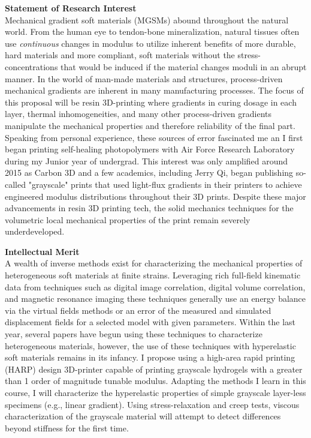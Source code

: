 \textbf{Statement of Research Interest} \\
Mechanical gradient soft materials (MGSMs) abound throughout the natural world. From the human eye to tendon-bone mineralization, natural tissues often use \textit{continuous} changes in modulus to utilize inherent benefits of more durable, hard materials and more compliant, soft materials without the stress-concentrations that would be induced if the material changes moduli in an abrupt manner. In the world of man-made materials and structures, process-driven mechanical gradients are inherent in many manufacturing processes. The focus of this proposal will be resin 3D-printing where gradients in curing dosage in each layer, thermal inhomogeneities, and many other process-driven gradients manipulate the mechanical properties and therefore reliability of the final part. Speaking from personal experience, these sources of error fascinated me an I first began printing self-healing photopolymers with Air Force Research Laboratory during my Junior year of undergrad. This interest was only amplified around 2015 as Carbon 3D and a few academics, including Jerry Qi, began publishing so-called "grayscale" prints that used light-flux gradients in their printers to achieve engineered modulus distributions throughout their 3D prints. Despite these major advancements in resin 3D printing tech, the solid mechanics techniques for  the volumetric local mechanical properties of the print remain severely underdeveloped.

\textbf{Intellectual Merit} \\
A wealth of inverse methods exist for characterizing the mechanical properties of heterogeneous soft materials at finite strains. Leveraging rich full-field kinematic data from techniques such as digital image correlation, digital volume correlation, and magnetic resonance imaging these techniques generally use an energy balance via the virtual fields methods or an error of the measured and simulated displacement fields for a selected model with given parameters. Within the last year, several papers have begun using these techniques to characterize heterogeneous materials, however, the use of these techniques with hyperelastic soft materials remains in its infancy. I propose using a high-area rapid printing (HARP) design 3D-printer capable of printing grayscale hydrogels with a greater than 1 order of magnitude tunable modulus. Adapting the methods I learn in this course, I will characterize the hyperelastic properties of simple grayscale layer-less specimens (e.g., linear gradient). Using stress-relaxation and creep tests, viscous characterization of the grayscale material will attempt to detect differences beyond stiffness for the first time. 

